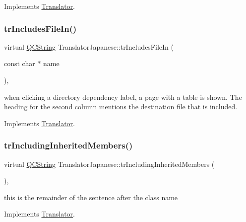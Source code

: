 Implements \mbox{\hyperlink{class_translator}{Translator}}.

\mbox{\label{class_translator_japanese_afa05a22f2cb6629b86c326b0fe56a3ac}} 
\subsubsection{\texorpdfstring{trIncludesFileIn()}{trIncludesFileIn()}}
{\footnotesize\ttfamily virtual \mbox{\hyperlink{class_q_c_string}{Q\+C\+String}} Translator\+Japanese\+::tr\+Includes\+File\+In (\begin{DoxyParamCaption}\item[{const char $\ast$}]{name }\end{DoxyParamCaption})\hspace{0.3cm}{\ttfamily [inline]}, {\ttfamily [virtual]}}

when clicking a directory dependency label, a page with a table is shown. The heading for the second column mentions the destination file that is included. 

Implements \mbox{\hyperlink{class_translator}{Translator}}.

\mbox{\label{class_translator_japanese_a610b6aa5096254ab88ce10ca55e24640}} 
\subsubsection{\texorpdfstring{trIncludingInheritedMembers()}{trIncludingInheritedMembers()}}
{\footnotesize\ttfamily virtual \mbox{\hyperlink{class_q_c_string}{Q\+C\+String}} Translator\+Japanese\+::tr\+Including\+Inherited\+Members (\begin{DoxyParamCaption}{ }\end{DoxyParamCaption})\hspace{0.3cm}{\ttfamily [inline]}, {\ttfamily [virtual]}}

this is the remainder of the sentence after the class name 

Implements \mbox{\hyperlink{class_translator}{Translator}}.

